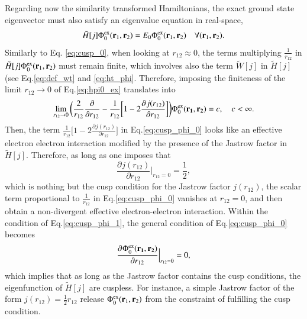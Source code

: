 \documentclass[aip,jcp,reprint,noshowkeys,superscriptaddress]{revtex4-1}
\newcommand{\deriv}[3]{\frac{\partial^{#3} #1}{\partial {#2}^{#3}}}
\newcommand{\bd}[1]{{\bf {#1}}}
\newcommand{\br}[0]{{\bf {r}}}
\newcommand{\phiex}[0]{\Phi^{\text{ex}}_0}
\begin{document}
Regarding now the similarity transformed Hamiltonians, the exact ground state eigenvector must also satisfy an eigenvalue equation in real-space,
\begin{equation}
 \label{eq:hpi0_ex}
 \tilde{H}[j] \phiex(\br{}_1,\br{}_2) = E_0 \phiex(\br{}_1,\br{}_2) \quad \forall (\br{}_1,\br{}_2).
\end{equation}
Similarly to Eq. \eqref{eq:cusp_0}, when looking at $r_{12}\approx 0$, the terms multiplying $\frac{1}{r_{12}}$ in $\tilde{H}[j]\phiex(\br{}_1,\br{}_2)$ must remain finite, 
which involves also the term $\tilde{W}[j]$ in $\tilde{H}[j]$ (see Eq.\eqref{eq:def_wt} and \eqref{eq:ht_phi}. Therefore, imposing the finiteness of the limit $r_{12}\rightarrow 0$ of Eq.\eqref{eq:hpi0_ex} translates into
\begin{equation}
 \label{eq:cusp_phi_0}
 \lim_{r_{12}\rightarrow 0}\bigg( \frac{2}{r_{12}} \deriv{}{r_{12}}{} -\frac{1}{r_{12}}\bigg[ 1 - 2 \deriv{j(r_{12})}{r_{12}}{}\bigg]\bigg) \phiex(\bd{r_1},\bd{r_2})  = c,\quad c<\infty.
\end{equation}
Then, the term $\frac{1}{r_{12}}\bigg[ 1 - 2\deriv{j(r_{12})}{r_{12}}{}\bigg]$ in Eq.\eqref{eq:cusp_phi_0} looks like an effective electron electron interaction modified by the presence of the Jastrow factor in $\tilde{H}[j]$. 
Therefore, as long as one imposes that 
\begin{equation}
 \label{eq:cusp_phi_1}
  \deriv{j(r_{12})}{r_{12}}{}\bigg|_{r_{12}=0} = \frac{1}{2},
\end{equation}
which is nothing but the cusp condition for the Jastrow factor $j(r_{12})$, the scalar term proportional to $\frac{1}{r_{12}}$ in Eq.\eqref{eq:cusp_phi_0} vanishes at $r_{12}=0$, and then obtain a non-divergent effective electron-electron interaction. 
Within the condition of Eq.\eqref{eq:cusp_phi_1}, the general condition of Eq.\eqref{eq:cusp_phi_0} becomes 
\begin{equation}
 \label{eq:cusp_phi_2}
 \deriv{\phiex(\bd{r_1},\bd{r_2})}{r_{12}}{}\Bigr|_{r_{12}=0} = 0, 
\end{equation}
which implies that as long as the Jastrow factor contains the cusp conditions, the eigenfunction of $\tilde{H}[j]$ are cuspless. 
For instance, a simple Jastrow factor of the form $j(r_{12}) = \frac{1}{2} r_{12}$ release $\phiex(\br{}_1,\br{}_2)$ from 
the constraint of fulfilling the cusp condition. 
\end{document}
